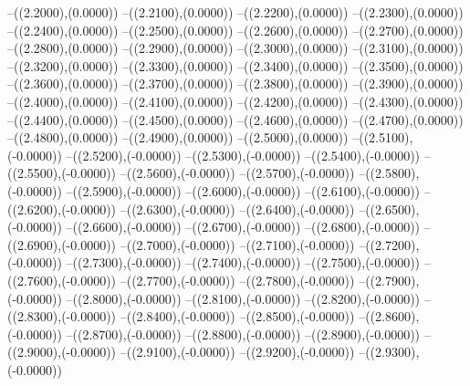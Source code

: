 {	--({\sx*(2.2000)},{\sy*(0.0000)})
	--({\sx*(2.2100)},{\sy*(0.0000)})
	--({\sx*(2.2200)},{\sy*(0.0000)})
	--({\sx*(2.2300)},{\sy*(0.0000)})
	--({\sx*(2.2400)},{\sy*(0.0000)})
	--({\sx*(2.2500)},{\sy*(0.0000)})
	--({\sx*(2.2600)},{\sy*(0.0000)})
	--({\sx*(2.2700)},{\sy*(0.0000)})
	--({\sx*(2.2800)},{\sy*(0.0000)})
	--({\sx*(2.2900)},{\sy*(0.0000)})
	--({\sx*(2.3000)},{\sy*(0.0000)})
	--({\sx*(2.3100)},{\sy*(0.0000)})
	--({\sx*(2.3200)},{\sy*(0.0000)})
	--({\sx*(2.3300)},{\sy*(0.0000)})
	--({\sx*(2.3400)},{\sy*(0.0000)})
	--({\sx*(2.3500)},{\sy*(0.0000)})
	--({\sx*(2.3600)},{\sy*(0.0000)})
	--({\sx*(2.3700)},{\sy*(0.0000)})
	--({\sx*(2.3800)},{\sy*(0.0000)})
	--({\sx*(2.3900)},{\sy*(0.0000)})
	--({\sx*(2.4000)},{\sy*(0.0000)})
	--({\sx*(2.4100)},{\sy*(0.0000)})
	--({\sx*(2.4200)},{\sy*(0.0000)})
	--({\sx*(2.4300)},{\sy*(0.0000)})
	--({\sx*(2.4400)},{\sy*(0.0000)})
	--({\sx*(2.4500)},{\sy*(0.0000)})
	--({\sx*(2.4600)},{\sy*(0.0000)})
	--({\sx*(2.4700)},{\sy*(0.0000)})
	--({\sx*(2.4800)},{\sy*(0.0000)})
	--({\sx*(2.4900)},{\sy*(0.0000)})
	--({\sx*(2.5000)},{\sy*(0.0000)})
	--({\sx*(2.5100)},{\sy*(-0.0000)})
	--({\sx*(2.5200)},{\sy*(-0.0000)})
	--({\sx*(2.5300)},{\sy*(-0.0000)})
	--({\sx*(2.5400)},{\sy*(-0.0000)})
	--({\sx*(2.5500)},{\sy*(-0.0000)})
	--({\sx*(2.5600)},{\sy*(-0.0000)})
	--({\sx*(2.5700)},{\sy*(-0.0000)})
	--({\sx*(2.5800)},{\sy*(-0.0000)})
	--({\sx*(2.5900)},{\sy*(-0.0000)})
	--({\sx*(2.6000)},{\sy*(-0.0000)})
	--({\sx*(2.6100)},{\sy*(-0.0000)})
	--({\sx*(2.6200)},{\sy*(-0.0000)})
	--({\sx*(2.6300)},{\sy*(-0.0000)})
	--({\sx*(2.6400)},{\sy*(-0.0000)})
	--({\sx*(2.6500)},{\sy*(-0.0000)})
	--({\sx*(2.6600)},{\sy*(-0.0000)})
	--({\sx*(2.6700)},{\sy*(-0.0000)})
	--({\sx*(2.6800)},{\sy*(-0.0000)})
	--({\sx*(2.6900)},{\sy*(-0.0000)})
	--({\sx*(2.7000)},{\sy*(-0.0000)})
	--({\sx*(2.7100)},{\sy*(-0.0000)})
	--({\sx*(2.7200)},{\sy*(-0.0000)})
	--({\sx*(2.7300)},{\sy*(-0.0000)})
	--({\sx*(2.7400)},{\sy*(-0.0000)})
	--({\sx*(2.7500)},{\sy*(-0.0000)})
	--({\sx*(2.7600)},{\sy*(-0.0000)})
	--({\sx*(2.7700)},{\sy*(-0.0000)})
	--({\sx*(2.7800)},{\sy*(-0.0000)})
	--({\sx*(2.7900)},{\sy*(-0.0000)})
	--({\sx*(2.8000)},{\sy*(-0.0000)})
	--({\sx*(2.8100)},{\sy*(-0.0000)})
	--({\sx*(2.8200)},{\sy*(-0.0000)})
	--({\sx*(2.8300)},{\sy*(-0.0000)})
	--({\sx*(2.8400)},{\sy*(-0.0000)})
	--({\sx*(2.8500)},{\sy*(-0.0000)})
	--({\sx*(2.8600)},{\sy*(-0.0000)})
	--({\sx*(2.8700)},{\sy*(-0.0000)})
	--({\sx*(2.8800)},{\sy*(-0.0000)})
	--({\sx*(2.8900)},{\sy*(-0.0000)})
	--({\sx*(2.9000)},{\sy*(-0.0000)})
	--({\sx*(2.9100)},{\sy*(-0.0000)})
	--({\sx*(2.9200)},{\sy*(-0.0000)})
	--({\sx*(2.9300)},{\sy*(-0.0000)})
}
